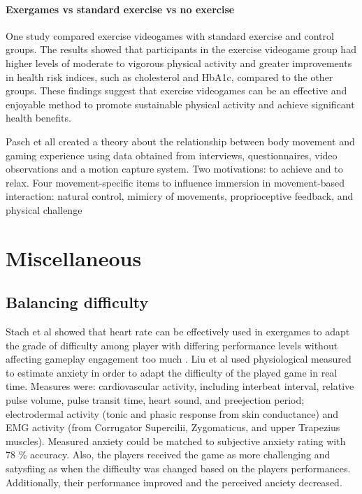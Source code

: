 \subsubsection{Exergames vs standard exercise vs no exercise}
One study \cite{bock2019exercise} compared exercise videogames with standard exercise and control groups. The results showed that participants in the exercise videogame group had higher levels of moderate to vigorous physical activity and greater improvements in health risk indices, such as cholesterol and HbA1c, compared to the other groups. These findings suggest that exercise videogames can be an effective and enjoyable method to promote sustainable physical activity and achieve significant health benefits.




Pasch et all \cite{pasch2009movement} created a theory about the relationship
between body movement and gaming experience using data obtained from interviews, questionnaires, video observations and a motion capture system. 
Two motivations: to achieve and to relax.
Four movement-specific items  to influence immersion in movement-based interaction: natural control, mimicry of movements, proprioceptive feedback, and physical challenge













\chapter{Miscellaneous}


\section{Balancing difficulty}
Stach et al showed that heart rate can be effectively used in exergames to adapt the grade of difficulty among player with differing performance levels without affecting gameplay engagement too much \cite{stach2009heart}.
Liu et al \cite{liu2009dynamic} used physiological measured to estimate anxiety in order to adapt the difficulty of the played game in real time. Measures were: cardiovascular activity, including interbeat interval, relative pulse volume, pulse transit time, heart sound, and preejection period; electrodermal activity (tonic and phasic response from skin conductance) and EMG activity (from Corrugator Supercilii, Zygomaticus, and upper Trapezius muscles). Measured anxiety could be matched to subjective anxiety rating with 78 \% accuracy. Also, the players received the game as more challenging and satysfiing as when the difficulty was changed based on the players performances. Additionally, their performance improved and the perceived anciety decreased.

